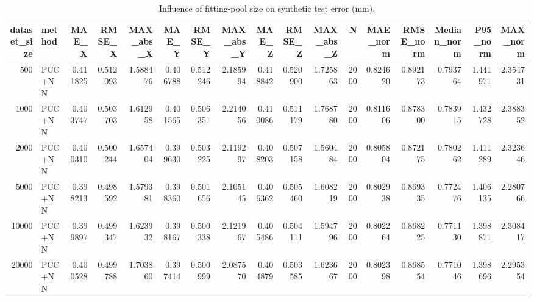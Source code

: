 \begin{table}
\caption{Influence of fitting-pool size on synthetic test error (mm).}
\label{tab:summer_dataset_size}
\begin{tabular}{rlrrrrrrrrrrrrrrr}
\toprule
dataset_size & method & MAE_X & RMSE_X & MAX_abs_X & MAE_Y & RMSE_Y & MAX_abs_Y & MAE_Z & RMSE_Z & MAX_abs_Z & N & MAE_norm & RMSE_norm & Median_norm & P95_norm & MAX_norm \\
\midrule
500 & PCC+NN & 0.411825 & 0.512093 & 1.588476 & 0.406788 & 0.512246 & 2.185994 & 0.418842 & 0.520900 & 1.725863 & 2000 & 0.824620 & 0.892173 & 0.793764 & 1.441971 & 2.354731 \\
1000 & PCC+NN & 0.403747 & 0.503703 & 1.612958 & 0.401565 & 0.506351 & 2.214056 & 0.410086 & 0.511179 & 1.768780 & 2000 & 0.811606 & 0.878300 & 0.783915 & 1.432728 & 2.388352 \\
2000 & PCC+NN & 0.400310 & 0.500244 & 1.657404 & 0.399630 & 0.503225 & 2.119297 & 0.408203 & 0.507158 & 1.560484 & 2000 & 0.805804 & 0.872175 & 0.780262 & 1.411289 & 2.323646 \\
5000 & PCC+NN & 0.398213 & 0.498592 & 1.579381 & 0.398360 & 0.501656 & 2.105145 & 0.406362 & 0.505460 & 1.608219 & 2000 & 0.802938 & 0.869335 & 0.772476 & 1.406135 & 2.280766 \\
10000 & PCC+NN & 0.399897 & 0.499347 & 1.623932 & 0.398167 & 0.500338 & 2.121967 & 0.405486 & 0.504111 & 1.594796 & 2000 & 0.802264 & 0.868225 & 0.771130 & 1.398871 & 2.308417 \\
20000 & PCC+NN & 0.400528 & 0.499788 & 1.703860 & 0.397414 & 0.500999 & 2.087570 & 0.404879 & 0.503585 & 1.623667 & 2000 & 0.802398 & 0.868554 & 0.771046 & 1.398696 & 2.295354 \\
\bottomrule
\end{tabular}
\end{table}

